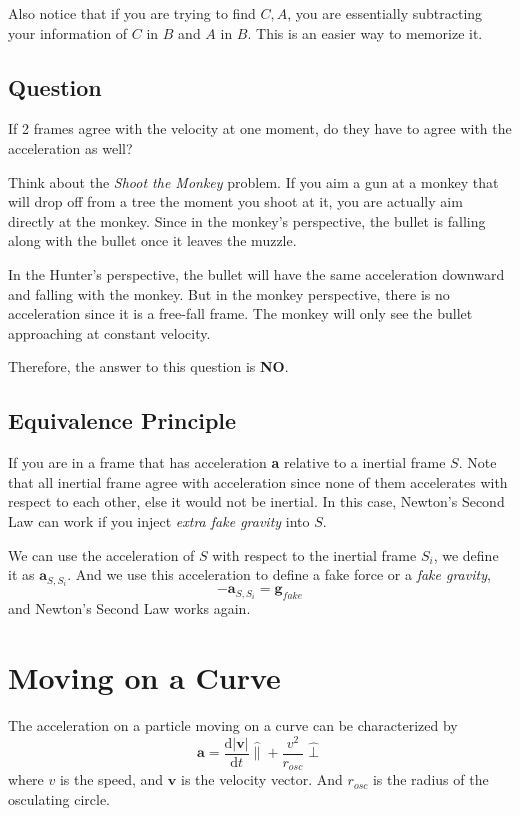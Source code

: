 \documentclass[12pt]{article}
\newcommand{\dydx}[2]{\frac{\text{d} #1}{\text{d} #2}}
\newcommand{\abso}[1]{\left|#1 \right|}
\begin{document}
Also notice that if you are trying to find $C,A$, you are essentially subtracting your information of $C$ in $B$ and $A$ in $B$. This is an easier way to memorize it. 

\subsection{Question}
If 2 frames agree with the velocity at one moment, do they have to agree with the acceleration as well?

Think about the \textit{Shoot the Monkey} problem. If you aim a gun at a monkey that will drop off from a tree the moment you shoot at it, you are actually aim directly at the monkey. Since in the monkey's perspective, the bullet is falling along with the bullet once it leaves the muzzle. 

In the Hunter's perspective, the bullet will have the same acceleration downward and falling with the monkey. But in the monkey perspective, there is no acceleration since it is a free-fall frame. The monkey will only see the bullet approaching at constant velocity. 

Therefore, the answer to this question is \textbf{NO}.

\subsection{Equivalence Principle}
If you are in a frame that has acceleration \textbf{a} relative to a inertial frame $S$. Note that all inertial frame agree with acceleration since none of them accelerates with respect to each other, else it would not be inertial. In this case, Newton's Second Law can work if you inject \textit{extra fake gravity} into $S$.

We can use the acceleration of $S$ with respect to the inertial frame $S_i$, we define it as $\mathbf{a}_{S,S_i}$. And we use this acceleration to define a fake force or a \textit{fake gravity}, 
\[
-\mathbf{a}_{S,S_i} = \mathbf{g}_{fake}
\]
and Newton's Second Law works again. 

\section{Moving on a Curve}
The acceleration on a particle moving on a curve can be characterized by
\[
\mathbf{a} = \dydx{\abso{\mathbf{v}}}{t}\hat{\parallel} + \frac{v^2}{r_{osc}}\hat{\perp}
\]
where $v$ is the speed, and $\mathbf{v}$ is the velocity vector. And $r_{osc}$ is the radius of the osculating circle.
\end{document}
